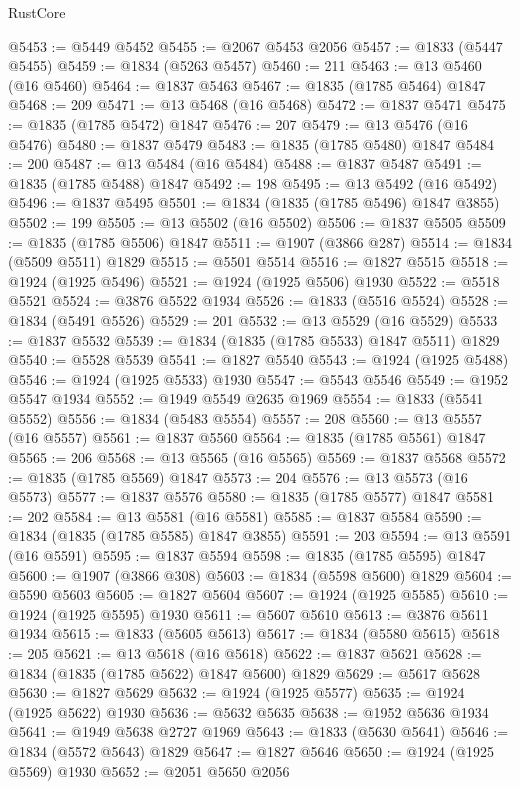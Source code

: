 \begin{lexlean}{RustCore}
\begin{coremodule}
@5453 := @5449 @5452
@5455 := @2067 @5453 @2056
@5457 := @1833 (@5447 @5455)
@5459 := @1834 (@5263 @5457)
@5460 := 211
@5463 := @13 @5460 (@16 @5460)
@5464 := @1837 @5463
@5467 := @1835 (@1785 @5464) @1847
@5468 := 209
@5471 := @13 @5468 (@16 @5468)
@5472 := @1837 @5471
@5475 := @1835 (@1785 @5472) @1847
@5476 := 207
@5479 := @13 @5476 (@16 @5476)
@5480 := @1837 @5479
@5483 := @1835 (@1785 @5480) @1847
@5484 := 200
@5487 := @13 @5484 (@16 @5484)
@5488 := @1837 @5487
@5491 := @1835 (@1785 @5488) @1847
@5492 := 198
@5495 := @13 @5492 (@16 @5492)
@5496 := @1837 @5495
@5501 := @1834 (@1835 (@1785 @5496) @1847 @3855)
@5502 := 199
@5505 := @13 @5502 (@16 @5502)
@5506 := @1837 @5505
@5509 := @1835 (@1785 @5506) @1847
@5511 := @1907 (@3866 @287)
@5514 := @1834 (@5509 @5511) @1829
@5515 := @5501 @5514
@5516 := @1827 @5515
@5518 := @1924 (@1925 @5496)
@5521 := @1924 (@1925 @5506) @1930
@5522 := @5518 @5521
@5524 := @3876 @5522 @1934
@5526 := @1833 (@5516 @5524)
@5528 := @1834 (@5491 @5526)
@5529 := 201
@5532 := @13 @5529 (@16 @5529)
@5533 := @1837 @5532
@5539 := @1834 (@1835 (@1785 @5533) @1847 @5511) @1829
@5540 := @5528 @5539
@5541 := @1827 @5540
@5543 := @1924 (@1925 @5488)
@5546 := @1924 (@1925 @5533) @1930
@5547 := @5543 @5546
@5549 := @1952 @5547 @1934
@5552 := @1949 @5549 @2635 @1969
@5554 := @1833 (@5541 @5552)
@5556 := @1834 (@5483 @5554)
@5557 := 208
@5560 := @13 @5557 (@16 @5557)
@5561 := @1837 @5560
@5564 := @1835 (@1785 @5561) @1847
@5565 := 206
@5568 := @13 @5565 (@16 @5565)
@5569 := @1837 @5568
@5572 := @1835 (@1785 @5569) @1847
@5573 := 204
@5576 := @13 @5573 (@16 @5573)
@5577 := @1837 @5576
@5580 := @1835 (@1785 @5577) @1847
@5581 := 202
@5584 := @13 @5581 (@16 @5581)
@5585 := @1837 @5584
@5590 := @1834 (@1835 (@1785 @5585) @1847 @3855)
@5591 := 203
@5594 := @13 @5591 (@16 @5591)
@5595 := @1837 @5594
@5598 := @1835 (@1785 @5595) @1847
@5600 := @1907 (@3866 @308)
@5603 := @1834 (@5598 @5600) @1829
@5604 := @5590 @5603
@5605 := @1827 @5604
@5607 := @1924 (@1925 @5585)
@5610 := @1924 (@1925 @5595) @1930
@5611 := @5607 @5610
@5613 := @3876 @5611 @1934
@5615 := @1833 (@5605 @5613)
@5617 := @1834 (@5580 @5615)
@5618 := 205
@5621 := @13 @5618 (@16 @5618)
@5622 := @1837 @5621
@5628 := @1834 (@1835 (@1785 @5622) @1847 @5600) @1829
@5629 := @5617 @5628
@5630 := @1827 @5629
@5632 := @1924 (@1925 @5577)
@5635 := @1924 (@1925 @5622) @1930
@5636 := @5632 @5635
@5638 := @1952 @5636 @1934
@5641 := @1949 @5638 @2727 @1969
@5643 := @1833 (@5630 @5641)
@5646 := @1834 (@5572 @5643) @1829
@5647 := @1827 @5646
@5650 := @1924 (@1925 @5569) @1930
@5652 := @2051 @5650 @2056

\end{coremodule}
\end{lexlean}

